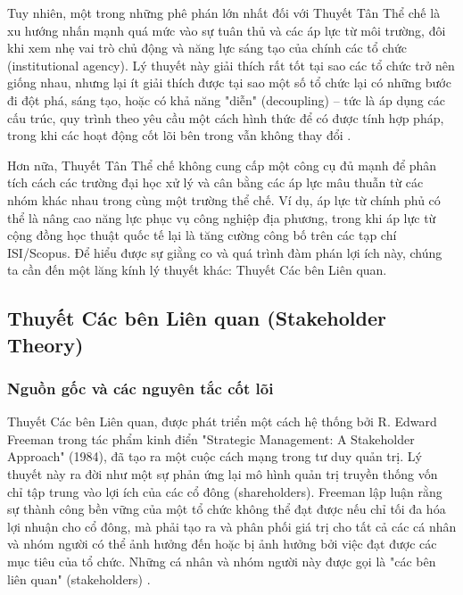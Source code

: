 \documentclass[12pt, a4paper, openany]{report}
\begin{document}
Tuy nhiên, một trong những phê phán lớn nhất đối với Thuyết Tân Thể chế là xu hướng nhấn mạnh quá mức vào sự tuân thủ và các áp lực từ môi trường, đôi khi xem nhẹ vai trò chủ động và năng lực sáng tạo của chính các tổ chức (institutional agency). Lý thuyết này giải thích rất tốt tại sao các tổ chức trở nên giống nhau, nhưng lại ít giải thích được tại sao một số tổ chức lại có những bước đi đột phá, sáng tạo, hoặc có khả năng "diễn" (decoupling) – tức là áp dụng các cấu trúc, quy trình theo yêu cầu một cách hình thức để có được tính hợp pháp, trong khi các hoạt động cốt lõi bên trong vẫn không thay đổi \cite{MeyerRowan1977}.

Hơn nữa, Thuyết Tân Thể chế không cung cấp một công cụ đủ mạnh để phân tích cách các trường đại học xử lý và cân bằng các áp lực mâu thuẫn từ các nhóm khác nhau trong cùng một trường thể chế. Ví dụ, áp lực từ chính phủ có thể là nâng cao năng lực phục vụ công nghiệp địa phương, trong khi áp lực từ cộng đồng học thuật quốc tế lại là tăng cường công bố trên các tạp chí ISI/Scopus. Để hiểu được sự giằng co và quá trình đàm phán lợi ích này, chúng ta cần đến một lăng kính lý thuyết khác: Thuyết Các bên Liên quan.

\subsection{Thuyết Các bên Liên quan (Stakeholder Theory)}
\label{subsec:ben_lien_quan_nen_tang}

\subsubsection{Nguồn gốc và các nguyên tắc cốt lõi}

Thuyết Các bên Liên quan, được phát triển một cách hệ thống bởi R. Edward Freeman trong tác phẩm kinh điển "Strategic Management: A Stakeholder Approach" (1984), đã tạo ra một cuộc cách mạng trong tư duy quản trị. Lý thuyết này ra đời như một sự phản ứng lại mô hình quản trị truyền thống vốn chỉ tập trung vào lợi ích của các cổ đông (shareholders). Freeman lập luận rằng sự thành công bền vững của một tổ chức không thể đạt được nếu chỉ tối đa hóa lợi nhuận cho cổ đông, mà phải tạo ra và phân phối giá trị cho tất cả các cá nhân và nhóm người có thể ảnh hưởng đến hoặc bị ảnh hưởng bởi việc đạt được các mục tiêu của tổ chức. Những cá nhân và nhóm người này được gọi là "các bên liên quan" (stakeholders) \cite{Freeman1984}.
\end{document}
